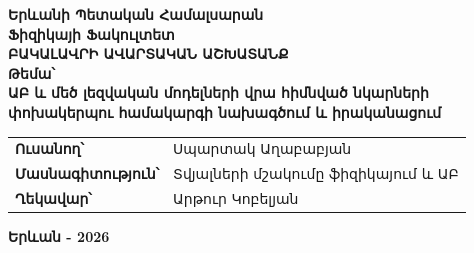 \documentclass[12pt,a4paper]{report}
\newcommand{\Eng}[1]{\textenglish{#1}}
\newcommand{\TODO}[1]{\textbf{[ԼՐԱՑՆԵԼ՝ #1]}}
\begin{document}
\begin{titlepage}
\begin{center}
{\bfseries Երևանի Պետական Համալսարան}\\[0.3cm]
{\bfseries Ֆիզիկայի Ֆակուլտետ}\\[0.3cm]

{\bfseries ԲԱԿԱԼԱՎՐԻ ԱՎԱՐՏԱԿԱՆ ԱՇԽԱՏԱՆՔ}\\[1.5cm]

{\bfseries Թեմա՝}\\[0.4cm]
{\bfseries \large \Eng{ԱԲ և մեծ լեզվական մոդելների վրա հիմնված նկարների փոխակերպու} համակարգի նախագծում և իրականացում}\\[2.0cm]

\begin{tabular}{>{\bfseries}p{5cm}p{8cm}}
Ուսանող՝ & Սպարտակ Աղաբաբյան \\
Մասնագիտություն՝ & Տվյալների մշակումը ֆիզիկայում և ԱԲ \\
Ղեկավար՝ & Արթուր Կոբելյան \\
\end{tabular}

\vfill
{\bfseries Երևան - 2026}
\end{center}
\end{titlepage}


\end{document}
